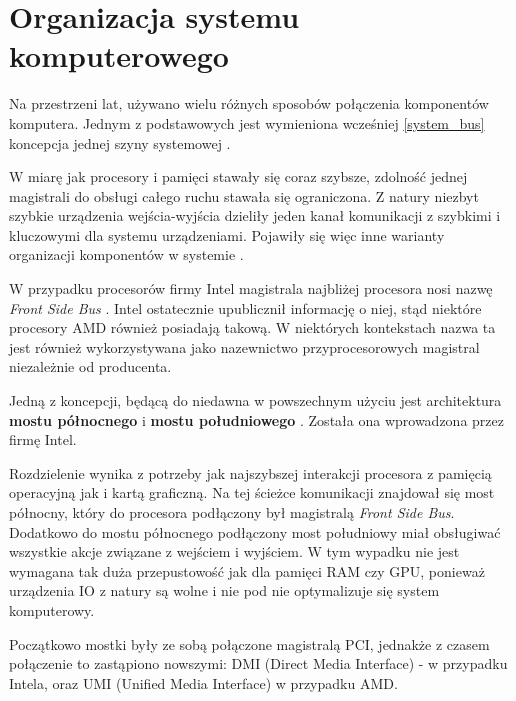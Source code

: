 \documentclass[shortabstract,inz]{iithesis}
\begin{document}
\section{Organizacja systemu komputerowego} %

Na przestrzeni lat, używano wielu różnych sposobów połączenia
komponentów komputera. Jednym z podstawowych jest wymieniona
wcześniej \ref{system_bus} koncepcja jednej szyny systemowej \cite{wiki:bus}.

W miarę jak procesory i pamięci stawały się coraz szybsze, zdolność jednej magistrali
do obsługi całego ruchu stawała się ograniczona. Z natury niezbyt szybkie urządzenia
wejścia-wyjścia dzieliły jeden kanał komunikacji z szybkimi i kluczowymi dla systemu urządzeniami.
Pojawiły się więc inne warianty organizacji komponentów w systemie \cite{book:tanenbaum_hardware}.


W przypadku procesorów firmy Intel magistrala najbliżej procesora 
nosi nazwę \textit{Front Side Bus} \cite{fsb}. Intel ostatecznie upublicznił
informację o niej, stąd niektóre procesory AMD również posiadają takową.
W niektórych kontekstach nazwa ta jest również wykorzystywana jako 
nazewnictwo przyprocesorowych magistral niezależnie od producenta.

Jedną z koncepcji, będącą do niedawna w powszechnym użyciu jest architektura 
\textbf{mostu północnego} \cite{northbridge}\cite{just2good} i 
\textbf{mostu południowego} \cite{southbridge}\cite{just2good}.
Została ona wprowadzona przez firmę Intel.

Rozdzielenie wynika z potrzeby jak najszybszej interakcji procesora z pamięcią
operacyjną jak i kartą graficzną. Na tej ścieżce komunikacji znajdował się most
północny, który do procesora podłączony był magistralą \textit{Front Side Bus}.
Dodatkowo do mostu północnego podłączony most południowy miał 
obsługiwać wszystkie akcje związane z wejściem i wyjściem. W tym wypadku nie jest wymagana tak duża 
przepustowość jak dla pamięci RAM czy GPU, ponieważ urządzenia IO z natury 
są wolne i nie pod nie optymalizuje się system komputerowy.

Początkowo mostki były ze sobą połączone magistralą PCI, jednakże z czasem 
połączenie to zastąpiono nowszymi: DMI (Direct Media Interface) - w przypadku 
Intela, oraz UMI (Unified Media Interface) w przypadku AMD.
\end{document}
